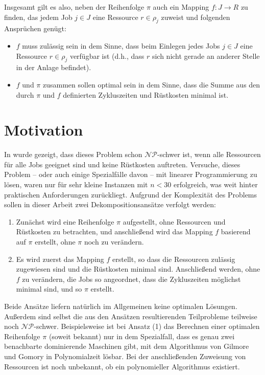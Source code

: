 \documentclass{scrreprt}
\begin{document}
Insgesamt gilt es also, neben der Reihenfolge $\pi$ auch ein Mapping $f:J\rightarrow R$ zu finden, 
das jedem Job $j\in J$ eine Ressource $r\in\rho_j$ zuweist und folgenden Ansprüchen genügt:
\begin{itemize}
    \item $f$ muss zulässig sein in dem Sinne, dass beim Einlegen jedes Jobs $j\in J$ eine Ressource $r\in\rho_j$ verfügbar ist
        (d.h., dass $r$ sich nicht gerade an anderer Stelle in der Anlage befindet).
    \item $f$ und $\pi$ zusammen sollen optimal sein in dem Sinne, dass die Summe aus den durch $\pi$ und $f$ definierten Zykluszeiten und 
        Rüstkosten minimal ist.
\end{itemize}

\section{Motivation}
In \cite{...} wurde gezeigt, dass dieses Problem schon $\mathcal{NP}$-schwer ist, wenn alle Ressourcen für alle Jobs geeignet sind
und keine Rüstkosten auftreten.
Versuche, dieses Problem -- oder auch einige Spezialfälle davon -- mit linearer Programmierung zu lösen, waren nur für sehr kleine Instanzen mit
$n<30$ erfolgreich, was weit hinter praktischen Anforderungen zurückliegt. Aufgrund der Komplexität des Problems sollen in dieser Arbeit
zwei Dekompositionsansätze verfolgt werden:
\begin{enumerate}
    \item Zunächst wird eine Reihenfolge $\pi$ aufgestellt, ohne Ressourcen und Rüstkosten zu betrachten, 
        und anschließend wird das Mapping $f$ basierend auf $\pi$ erstellt, ohne $\pi$ noch zu verändern.
    \item Es wird zuerst das Mapping $f$ erstellt, so dass die Ressourcen zulässig zugewiesen sind und die Rüstkosten minimal sind.
        Anschließend werden, ohne $f$ zu verändern, die Jobs so angeordnet, dass die Zykluszeiten möglichst minimal sind, und so $\pi$ erstellt.
\end{enumerate}%
Beide Ansätze liefern natürlich im Allgemeinen keine optimalen Lösungen. 
Außerdem sind selbst die aus den Ansätzen resultierenden Teilprobleme teilweise noch $\mathcal{NP}$-schwer.
Beispielsweise ist bei Ansatz (1) das Berechnen einer optimalen Reihenfolge $\pi$ (soweit bekannt) nur in dem Spezialfall,
dass es genau zwei benachbarte dominierende Maschinen gibt,
mit dem Algorithmus von Gilmore und Gomory \cite{...} in Polynomialzeit lösbar.
Bei der anschließenden Zuweisung von Ressourcen ist noch unbekannt, ob ein polynomieller Algorithmus existiert.
\end{document}
